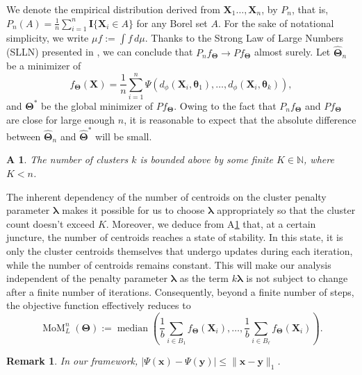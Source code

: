 \documentclass{article}
\newcommand{\bX}{\boldsymbol{X}}
\newcommand{\bTheta}{\boldsymbol{\Theta}}
\newtheorem{assumption}{A\hspace{-2pt}}
\newtheorem{remark}{\textbf{Remark}}
\begin{document}
We denote the empirical distribution derived from $\bX_1\ldots,\bX_n$, by $P_n$, that is, $P_n(A) = \frac{1}{n}\sum_{i=1}^n \mathbf{I}\{\bX_i \in A\}$ for any Borel set $A$. 
For the sake of notational simplicity, we write $\mu f := \int f \, d\mu$. Thanks to the Strong Law of Large Numbers (SLLN) presented in \cite{athreya2006measure}, we can conclude that $P_n f_{\bTheta} \rightarrow Pf_{\bTheta}$ almost surely. Let $\widehat{\bm{\Theta}}_n$ be a minimizer of \[f_{\bm\Theta}(\bm{X})=\frac{1}{n} \sum_{i=1}^n \Psi(d_{\phi}(\bm{X}_i, \bm{\theta}_1), \ldots, d_{\phi}(\bm{X}_i, \bm{\theta}_k)),\]
and $\bm{\Theta}^*$ be the global minimizer of $Pf_{\bm{\Theta}}$. 
Owing to the fact that $P_n f_{\bm{\Theta}}$ and $P f_{\bTheta}$ are close for large enough $n$, it is reasonable to expect that the absolute difference between $\widehat{\bm{\Theta}}_n$ and $\bm{\widehat{\Theta}}^*$ will be small. %

\begin{assumption}\label{ass-2-cluster-count}
    The number of clusters $k$ is bounded above by some finite $K\in \mathbb{N}$, where $K < n$.
\end{assumption}

The inherent dependency of the number of centroids on the cluster penalty parameter $\bm{\lambda}$ makes it possible for us to choose $\bm{\lambda}$ appropriately so that the cluster count doesn't exceed $K$. Moreover, we deduce from A\ref{ass-2-cluster-count} that, at a certain juncture, the number of centroids reaches a state of stability. In this state, it is only the cluster centroids themselves that undergo updates during each iteration, while the number of centroids remains constant. This will make our analysis independent of the penalty parameter $\bm{\lambda}$ as the term $k\bm{\lambda}$ is not subject to change after a finite number of iterations. Consequently, beyond a finite number of steps, the objective function effectively reduces to 
\begin{equation}\label{DP-MoM-obj}
    \operatorname{MoM}_L^n(\bTheta) := \operatorname{median} \left(\frac{1}{b}\sum_{i\in B_{1}}f_{\bm{\Theta}}(\bm{X}_i), \ldots, \frac{1}{b}\sum_{i\in B_{\ell}}f_{\bm{\Theta}}(\bm{X}_i)\right).
\end{equation} 

\begin{remark}
    In our framework, $\displaystyle |\Psi(\bm{x})-\Psi(\bm{y})|\le \|\bm{x}-\bm{y}\|_1$.
\end{remark}
\end{document}
